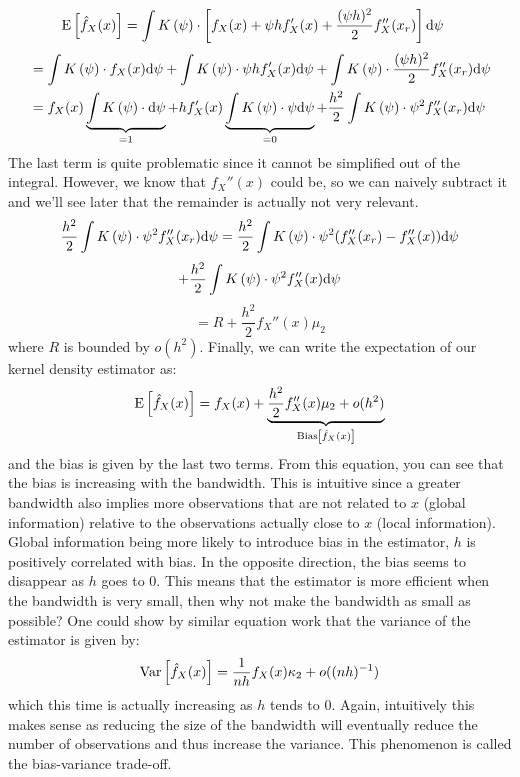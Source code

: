 \begin{align*}
\operatorname{E}\left[\hat f_X(x)\right] & = \int K\left(\psi\right)\cdot \left[ f_X(x) + \psi h f_X'(x) + \frac{(\psi h)^2}{2}	 f_X''(x_r)\right] \mathrm{d} \psi  
\end{align*}
\begin{align*}
& = \int K\left(\psi\right)\cdot f_X(x) \mathrm{d} \psi  + \int K\left(\psi\right)\cdot \psi h f_X'(x) \mathrm{d} \psi + \int K\left(\psi\right)\cdot \frac{(\psi h)^2}{2}	 f_X''(x_r) \mathrm{d} \psi \\ & = f_X(x) \underbrace{\int K\left(\psi\right)\cdot \mathrm{d} \psi}_{=1}  + h f_X'(x)\underbrace{\int K\left(\psi\right)\cdot \psi \mathrm{d} \psi}_{=0} + \frac{h^2}{2}\int K\left(\psi\right)\cdot \psi^2	 f_X''(x_r) \mathrm{d} \psi
\end{align*}
The last term is quite problematic since it cannot be simplified out of the integral. However, we know that $f_X''(x)$ could be, so we can naively subtract it and we'll see later that the remainder is actually not very relevant. $$ \frac{h^2}{2}\int K\left(\psi\right)\cdot \psi^2	 f_X''(x_r) \mathrm{d} \psi = \frac{h^2}{2} \int K\left(\psi\right)\cdot \psi^2	 (f_X''(x_r) - f_X''(x)) \mathrm{d} \psi $$ $$ + \frac{h^2}{2} \int K\left(\psi\right)\cdot \psi^2 f_X''(x) \mathrm{d} \psi $$ $$ = R + \frac{h^2}{2}  f_X''(x) \mu_2 $$ where $R$ is bounded by $o(h^2)$. Finally, we can write the expectation of our kernel density estimator as: $$ \operatorname{E}\left[\hat f_X(x)\right] = f_X(x) + \underbrace{\frac{h^2}{2}  f_X''(x) \mu_2 + o(h^2)}_{\operatorname{Bias}\left[\hat f_X(x)\right]} $$ and the bias is given by the last two terms. From this equation, you can see that the bias is increasing with the bandwidth. This is intuitive since a greater bandwidth also implies more observations that are not related to $x$ (global information) relative to the observations actually close to $x$ (local information). Global information being more likely to introduce bias in the estimator, $h$ is positively correlated with bias. In the opposite direction, the bias seems to disappear as $h$ goes to 0. This means that the estimator is more efficient when the bandwidth is very small, then why not make the bandwidth as small as possible? One could show by similar equation work that the variance of the estimator is given by: $$
\operatorname{Var}\left[\hat f_X(x)\right] = \frac{1}{nh}  f_X(x) \kappa_2 + o((nh)^{-1}) $$
which this time is actually increasing as $h$ tends to 0. Again, intuitively this makes sense as reducing the size of the bandwidth will eventually reduce the number of observations and thus increase the variance. This phenomenon is called the bias-variance trade-off.

